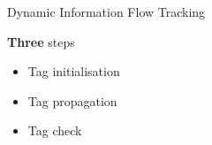 \begin{frame}{Dynamic Information Flow Tracking}
    \begin{minipage}[c]{0.35\linewidth}
        \begingroup
        \begin{block}{\textbf{Three} steps}
            \begin{itemize}
                \item<1-> Tag initialisation
                \item<2-> Tag propagation
                \item<3-> Tag check
            \end{itemize}
        \end{block}
        \endgroup
    \end{minipage}\hfill%
    \begin{minipage}[c]{0.6\linewidth}
        \begin{figure}
            \centering
            \label{fig:schemaDIFT}
        \end{figure}
    \end{minipage}
\end{frame}
